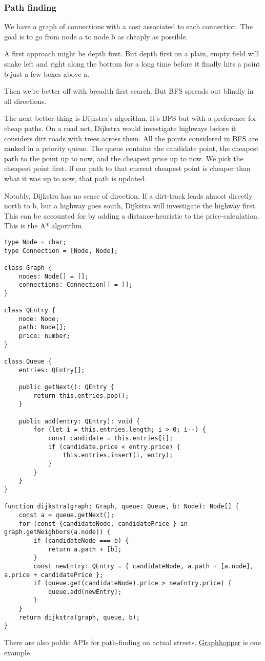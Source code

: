 \subsubsection{Path finding}
We have a graph of connections with a cost associated to each connection.
The goal is to go from node a to node b as cheaply as possible.

A first approach might be depth first. But depth first on a plain, empty field will snake left and right along the bottom 
for a long time before it finally hits a point b just a few boxes above a.

Then we're better off with breadth first search. But BFS spreads out blindly in all directions.

The next better thing is Dijkstra's algorithm. It's BFS but with a preference for cheap paths.
On a road net, Dijkstra would investigate highways before it considers dirt roads with trees across them.
All the points considered in BFS are ranked in a priority queue.
The queue contains the candidate point, the cheapest path to the point up to now, and the cheapest price up to now.
We pick the cheapest point first. If our path to that current cheapest point is cheaper than what it was up to now, that path is updated.

Notably, Dijkstra has no sense of direction.
If a dirt-track leads almost directly north to b, but a highway goes south, Dijkstra will investigate the highway first.
This can be accounted for by adding a distance-heuristic to the price-calculation.
This is the A* algorithm.

\begin{lstlisting}
type Node = char;
type Connection = [Node, Node];

class Graph {
    nodes: Node[] = [];
    connections: Connection[] = [];
}

class QEntry {
    node: Node;
    path: Node[];
    price: number;
}

class Queue {
    entries: QEntry[];

    public getNext(): QEntry {
        return this.entries.pop();
    }

    public add(entry: QEntry): void {
        for (let i = this.entries.length; i > 0; i--) {
            const candidate = this.entries[i];
            if (candidate.price < entry.price) {
                this.entries.insert(i, entry);
            }
        }
    }
}

function dijkstra(graph: Graph, queue: Queue, b: Node): Node[] {
    const a = queue.getNext();
    for (const {candidateNode, candidatePrice } in graph.getNeighbors(a.node)) {
        if (candidateNode === b) {
            return a.path + [b];
        }
        const newEntry: QEntry = { candidateNode, a.path + [a.node], a.price + candidatePrice };
        if (queue.get(candidateNode).price > newEntry.price) {
            queue.add(newEntry);
        }
    }
    return dijkstra(graph, queue, b);
}
\end{lstlisting}

There are also public APIs for path-finding on actual streets. \href{https://www.graphhopper.com/}{Graphhopper} is one example.
